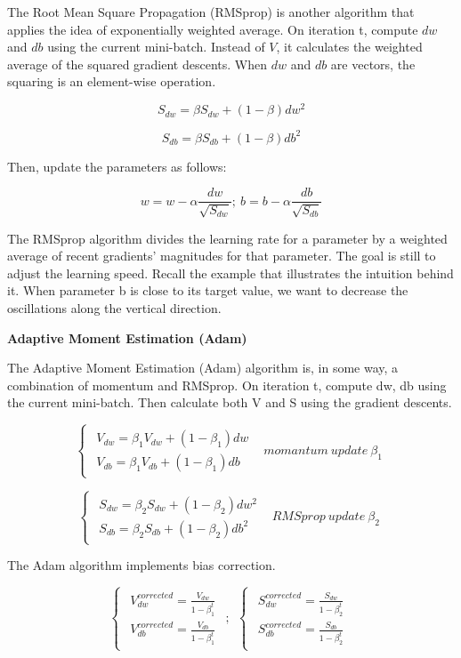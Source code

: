 \documentclass[
  12pt,
]{krantz}
\begin{document}
The Root Mean Square Propagation (RMSprop) is another algorithm that applies the idea of exponentially weighted average. On iteration t, compute \(dw\) and \(db\) using the current mini-batch. Instead of \(V\), it calculates the weighted average of the squared gradient descents. When \(dw\) and \(db\) are vectors, the squaring is an element-wise operation.

\[S_{dw}=\beta S_{dw} + (1-\beta)dw^2\]

\[S_{db}=\beta S_{db} + (1-\beta)db^2\]

Then, update the parameters as follows:

\[w = w - \alpha \frac{dw}{\sqrt{S_{dw}}};\ b=b-\alpha \frac{db}{\sqrt{S_{db}}}\]

The RMSprop algorithm divides the learning rate for a parameter by a weighted average of recent gradients' magnitudes for that parameter. The goal is still to adjust the learning speed. Recall the example that illustrates the intuition behind it. When parameter b is close to its target value, we want to decrease the oscillations along the vertical direction.

\textbf{Adaptive Moment Estimation (Adam)}

The Adaptive Moment Estimation (Adam) algorithm is, in some way, a combination of momentum and RMSprop. On iteration t, compute dw, db using the current mini-batch. Then calculate both V and S using the gradient descents.

\[\begin{cases} \begin{array}{c} V_{dw}=\beta_{1}V_{dw}+(1-\beta_{1})dw\\ V_{db}=\beta_{1}V_{db}+(1-\beta_{1})db \end{array} & momantum\ update\ \beta_{1}\end{cases}\]

\[\begin{cases} \begin{array}{c} S_{dw}=\beta_{2}S_{dw}+(1-\beta_{2})dw^{2}\\ S_{db}=\beta_{2}S_{db}+(1-\beta_{2})db^{2} \end{array} & RMSprop\ update\ \beta_{2}\end{cases}\]

The Adam algorithm implements bias correction.

\[\begin{cases} \begin{array}{c} V_{dw}^{corrected}=\frac{V_{dw}}{1-\beta_{1}^{t}}\\ V_{db}^{corrected}=\frac{V_{db}}{1-\beta_{1}^{t}} \end{array}\end{cases};\ \ \begin{cases} \begin{array}{c} S_{dw}^{corrected}=\frac{S_{dw}}{1-\beta_{2}^{t}}\\ S_{db}^{corrected}=\frac{S_{db}}{1-\beta_{2}^{t}} \end{array}\end{cases}\]
\end{document}
